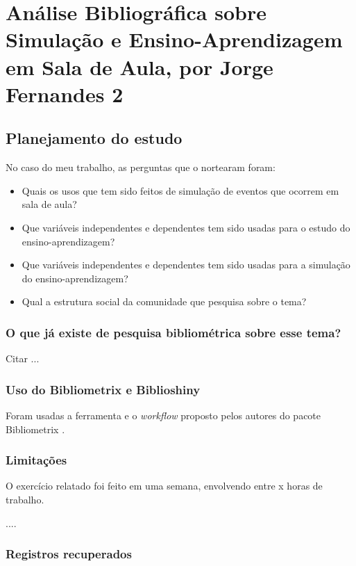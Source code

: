 \chapter{Análise Bibliográfica sobre Simulação e Ensino-Aprendizagem em Sala de Aula, por Jorge Fernandes 2\label{chap:bibliometria:jhcf2}}

\section{Planejamento do estudo\label{STL@jhcf:questoes}}

No caso do meu trabalho, as perguntas que o nortearam foram:
\begin{itemize}
    \item Quais os usos que tem sido feitos de simulação de eventos que ocorrem em sala de aula? 
    \item Que variáveis independentes e dependentes tem sido usadas para o estudo do ensino-aprendizagem? 
    \item Que variáveis independentes e dependentes tem sido usadas para a simulação do ensino-aprendizagem? 
    \item Qual a estrutura social da comunidade que pesquisa sobre o tema?
\end{itemize}

\subsection{O que já existe de pesquisa bibliométrica sobre esse tema?}

Citar ...

\subsection{Uso do Bibliometrix e Biblioshiny}

Foram usadas a ferramenta e o \textit{workflow} proposto pelos autores do pacote Bibliometrix \cite{aria_bibliometrix_2017}.

\subsection{Limitações} O exercício relatado foi feito em uma semana, envolvendo entre x horas de trabalho.

....

\subsection{Registros recuperados}

